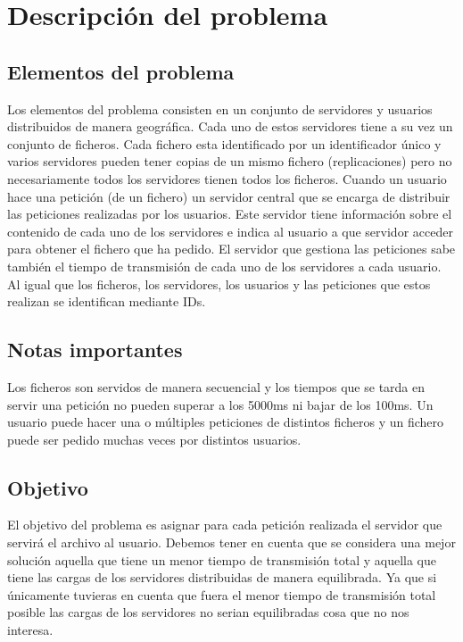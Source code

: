 


\section{Descripción del problema}


\subsection{Elementos del problema}

Los elementos del problema consisten en un conjunto de servidores y usuarios distribuidos de manera geográfica. Cada
uno de estos servidores tiene a su vez un conjunto de ficheros. Cada fichero esta identificado por un identificador
único y varios servidores pueden tener copias de un mismo fichero (replicaciones) pero no necesariamente todos
los servidores tienen todos los ficheros. Cuando un usuario hace una petición (de un fichero)
un servidor central que se encarga de distribuir las peticiones realizadas por los usuarios. Este servidor tiene información
sobre el contenido de cada uno de los servidores e indica al usuario a que
servidor acceder para obtener el fichero que ha pedido. El servidor que gestiona las peticiones sabe también el tiempo
de transmisión de cada uno de los servidores a cada usuario. Al igual que los ficheros, los servidores, los usuarios y
las peticiones que estos realizan se identifican mediante IDs.

\subsection{Notas importantes}

Los ficheros son servidos de manera secuencial y los tiempos que se tarda en servir una petición no pueden superar a los 5000ms ni bajar de los 100ms. Un usuario puede hacer una o múltiples peticiones de distintos ficheros y un fichero puede ser pedido muchas veces por distintos usuarios.

\subsection{Objetivo}

El objetivo del problema es asignar para cada petición realizada el servidor que servirá el archivo al usuario.
Debemos tener en cuenta que se considera una mejor solución aquella que tiene un menor tiempo de transmisión total y aquella que tiene las cargas de los servidores distribuidas de manera equilibrada. Ya que si únicamente tuvieras en cuenta que fuera el menor tiempo de transmisión total posible las cargas de los servidores no serian equilibradas cosa que no nos interesa.


